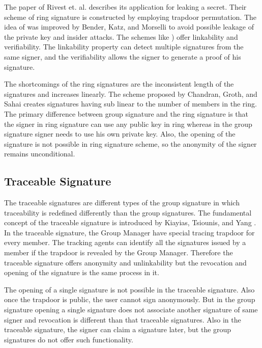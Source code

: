 The paper of Rivest et. al. describes its application for leaking a secret. Their scheme of ring signature is constructed by employing trapdoor permutation. The idea of \cite{rivest2001leak} was improved by Bender, Katz, and Morselli \cite{bender2009ring} to avoid possible leakage of the private key and insider attacks. The schemes like \cite{liu2004linkable, tsang2004separable, tsang2005short, lee2005convertible, zhang2006new}) offer linkability and verifiability. The linkability property can detect multiple signatures from the same signer, and the verifiability allows the signer to generate a proof of his signature. 

The shortcomings of the ring signatures are the inconsistent length of the signatures and increases linearly. The scheme proposed by Chandran, Groth, and Sahai \cite{chandran2007ring} creates signatures having sub linear to the number of members in the ring. The primary difference between group signature and the ring signature is that the signer in ring signature can use any public key in ring whereas in the group signature signer needs to use his own private key. Also, the opening of the signature is not possible in ring signature scheme, so the anonymity of the signer remains unconditional.

\subsection{Traceable Signature}
The traceable signatures are different types of the group signature in which traceability is redefined differently than the group signatures. The fundamental concept of the traceable signature is introduced by Kiayias, Tsiounis, and Yang \cite{kiayias2004traceable}. In the traceable signature, the Group Manager have special tracing trapdoor for every member. The tracking agents can identify all the signatures issued by a member if the trapdoor is revealed by the Group Manager. Therefore the traceable signature offers anonymity and unlinkability but the revocation and opening of the signature is the same process in it. 

The opening of a single signature is not possible in the traceable signature. Also once the trapdoor is public, the user cannot sign anonymously. But in the group signature opening a single signature does not associate another signature of same signer and revocation is different than that traceable signatures. Also in the traceable signature, the signer can claim a signature later, but the group signatures do not offer such functionality.

